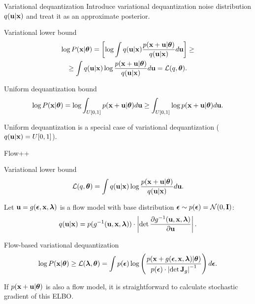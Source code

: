 \begin{frame}{Variational dequantization}
	Introduce variational dequantization noise distribution $q(\mathbf{u} | \mathbf{x})$ and treat it as an approximate posterior. 
	\begin{block}{Variational lower bound}
		\vspace{-0.7cm}
		\begin{multline*}
			\log P(\mathbf{x} | \boldsymbol{\theta}) = \left[ \log \int q(\mathbf{u} | \mathbf{x}) \frac{p(\mathbf{x} + \mathbf{u} | \boldsymbol{\theta})}{q(\mathbf{u} | \mathbf{x})} d \mathbf{u} \right] \geq \\ 
			\geq  \int q(\mathbf{u} | \mathbf{x}) \log \frac{p(\mathbf{x} + \mathbf{u} | \boldsymbol{\theta})}{q(\mathbf{u} | \mathbf{x})} d \mathbf{u} = \mathcal{L}(q, \boldsymbol{\theta}).
		\end{multline*}
	\end{block}
	\vspace{-0.6cm}
	\begin{block}{Uniform dequantization bound}
		\vspace{-0.6cm}
		\[
		\log P(\mathbf{x} | \boldsymbol{\theta}) = \log \int_{U[0, 1]} p(\mathbf{x} + \mathbf{u} | \boldsymbol{\theta}) d \mathbf{u} \geq \int_{U[0, 1]} \log p(\mathbf{x} + \mathbf{u} | \boldsymbol{\theta}) d \mathbf{u}.
		\]
		\vspace{-0.4cm}
	\end{block}
	Uniform dequantization is a special case of variational dequantization ($q(\mathbf{u} | \mathbf{x}) = U[0, 1]$).
\end{frame}
\begin{frame}{Flow++}
	\vspace{-0.3cm}
	\begin{block}{Variational lower bound}
		\vspace{-0.3cm}
		\[
		\mathcal{L}(q, \boldsymbol{\theta}) = \int q(\mathbf{u} | \mathbf{x}) \log \frac{p(\mathbf{x} + \mathbf{u} | \boldsymbol{\theta})}{q(\mathbf{u} | \mathbf{x})} d \mathbf{u}.
		\]
		\vspace{-0.3cm}
	\end{block}
	Let $\mathbf{u} = g(\boldsymbol{\epsilon}, \mathbf{x}, \boldsymbol{\lambda})$ is a flow model with base distribution $\boldsymbol{\epsilon} \sim p(\boldsymbol{\epsilon}) = \mathcal{N}(0, \mathbf{I})$:
	\vspace{-0.3cm}
	\[
	q(\mathbf{u} | \mathbf{x}) = p(g^{-1}(\mathbf{u}, \mathbf{x}, \boldsymbol{\lambda})) \cdot \left| \det \frac{\partial g^{-1}(\mathbf{u}, \mathbf{x}, \boldsymbol{\lambda})}{\partial \mathbf{u}}\right|.
	\]
	\vspace{-0.7cm}
	\begin{block}{Flow-based variational dequantization}
		\vspace{-0.8cm}
		\[
		\log P(\mathbf{x} | \boldsymbol{\theta}) \geq \mathcal{L}(\boldsymbol{\lambda}, \boldsymbol{\theta}) = \int p(\boldsymbol{\epsilon}) \log \left( \frac{p(\mathbf{x} + g(\boldsymbol{\epsilon}, \mathbf{x}, \boldsymbol{\lambda}) | \boldsymbol{\theta})}{p(\boldsymbol{\epsilon}) \cdot \left| \det \mathbf{J}_g\right|^{-1}} \right) d\boldsymbol{\epsilon}.
		\]
		\vspace{-0.3cm}
	\end{block}
	If $p(\mathbf{x} + \mathbf{u} | \boldsymbol{\theta})$ is also a flow model, it is straightforward to calculate stochastic gradient of this ELBO.
\end{frame}
